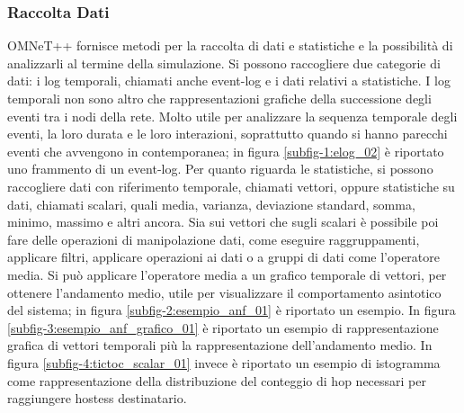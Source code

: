 \subsubsection{Raccolta Dati}
OMNeT++ fornisce metodi per la raccolta di dati e statistiche e la possibilità di analizzarli al termine della simulazione. Si possono raccogliere due categorie di dati: i log temporali, chiamati anche event-log e i dati relativi a statistiche. I log temporali non sono altro che rappresentazioni grafiche della successione degli eventi tra i nodi della rete. Molto utile per analizzare la sequenza temporale degli eventi, la loro durata e le loro interazioni, soprattutto quando si hanno parecchi eventi che avvengono in contemporanea; in figura \ref{subfig-1:elog_02} è riportato uno frammento di un event-log. Per quanto riguarda le statistiche, si possono raccogliere dati con riferimento temporale, chiamati vettori, oppure statistiche su dati, chiamati scalari, quali media, varianza, deviazione standard, somma, minimo, massimo e altri ancora. Sia sui vettori che sugli scalari è possibile poi fare delle operazioni di manipolazione dati, come eseguire raggruppamenti, applicare filtri, applicare operazioni ai dati o a gruppi di dati come l'operatore media. Si può applicare l'operatore media a un grafico temporale di vettori, per ottenere l'andamento medio, utile per visualizzare il comportamento asintotico del sistema; in figura \ref{subfig-2:esempio_anf_01} è riportato un esempio. In figura \ref{subfig-3:esempio_anf_grafico_01} è riportato un esempio di rappresentazione grafica di vettori temporali più la rappresentazione dell'andamento medio. In figura \ref{subfig-4:tictoc_scalar_01} invece è riportato un esempio di istogramma come rappresentazione della distribuzione del conteggio di hop necessari per raggiungere hostess destinatario.
\bigskip
%

